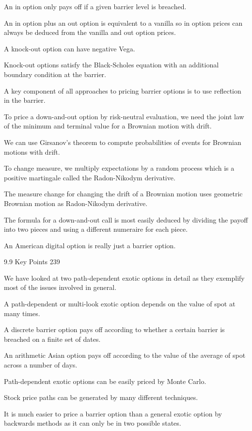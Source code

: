 An in option only pays off if a given barrier level is breached.

An in option plus an out option is equivalent to a vanilla so in option prices can always be deduced from the vanilla and out option prices.

A knock-out option can have negative Vega.

Knock-out options satisfy the Black-Scholes equation with an additional boundary condition at the barrier.

A key component of all approaches to pricing barrier options is to use reflection in the barrier.

To price a down-and-out option by risk-neutral evaluation, we need the joint law of the minimum and terminal value for a Brownian motion with drift.

We can use Girsanov's theorem to compute probabilities of events for Brownian motions with drift.

To change measure, we multiply expectations by a random process which is a positive martingale called the Radon-Nikodym derivative.

The measure change for changing the drift of a Brownian motion uses geometric Brownian motion as Radon-Nikodym derivative.

The formula for a down-and-out call is most easily deduced by dividing the payoff into two pieces and using a different numeraire for each piece.

An American digital option is really just a barrier option.

9.9 Key Points 239

We have looked at two path-dependent exotic options in detail as they exemplify most of the issues involved in general.

A path-dependent or multi-look exotic option depends on the value of spot at many times.

A discrete barrier option pays off according to whether a certain barrier is breached on a finite set of dates.

An arithmetic Asian option pays off according to the value of the average of spot across a number of days.

Path-dependent exotic options can be easily priced by Monte Carlo.

Stock price paths can be generated by many different techniques.

It is much easier to price a barrier option than a general exotic option by backwards methods as it can only be in two possible states.

